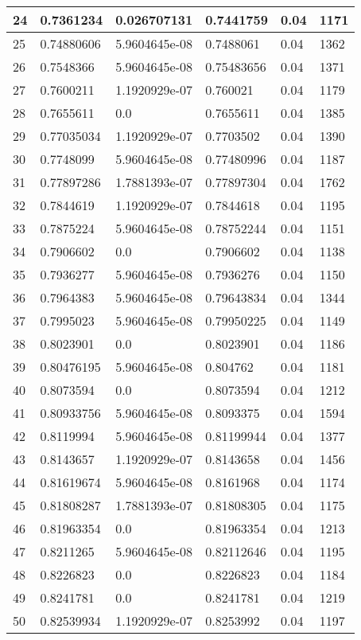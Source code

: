 \begin{longtable}{|l|l|l|l|l|l|}
24 & 0.7361234 & 0.026707131 & 0.7441759 & 0.04 & 1171 \\ \hline 
25 & 0.74880606 & 5.9604645e-08 & 0.7488061 & 0.04 & 1362 \\ \hline 
26 & 0.7548366 & 5.9604645e-08 & 0.75483656 & 0.04 & 1371 \\ \hline 
27 & 0.7600211 & 1.1920929e-07 & 0.760021 & 0.04 & 1179 \\ \hline 
28 & 0.7655611 & 0.0 & 0.7655611 & 0.04 & 1385 \\ \hline 
29 & 0.77035034 & 1.1920929e-07 & 0.7703502 & 0.04 & 1390 \\ \hline 
30 & 0.7748099 & 5.9604645e-08 & 0.77480996 & 0.04 & 1187 \\ \hline 
31 & 0.77897286 & 1.7881393e-07 & 0.77897304 & 0.04 & 1762 \\ \hline 
32 & 0.7844619 & 1.1920929e-07 & 0.7844618 & 0.04 & 1195 \\ \hline 
33 & 0.7875224 & 5.9604645e-08 & 0.78752244 & 0.04 & 1151 \\ \hline 
34 & 0.7906602 & 0.0 & 0.7906602 & 0.04 & 1138 \\ \hline 
35 & 0.7936277 & 5.9604645e-08 & 0.7936276 & 0.04 & 1150 \\ \hline 
36 & 0.7964383 & 5.9604645e-08 & 0.79643834 & 0.04 & 1344 \\ \hline 
37 & 0.7995023 & 5.9604645e-08 & 0.79950225 & 0.04 & 1149 \\ \hline 
38 & 0.8023901 & 0.0 & 0.8023901 & 0.04 & 1186 \\ \hline 
39 & 0.80476195 & 5.9604645e-08 & 0.804762 & 0.04 & 1181 \\ \hline 
40 & 0.8073594 & 0.0 & 0.8073594 & 0.04 & 1212 \\ \hline 
41 & 0.80933756 & 5.9604645e-08 & 0.8093375 & 0.04 & 1594 \\ \hline 
42 & 0.8119994 & 5.9604645e-08 & 0.81199944 & 0.04 & 1377 \\ \hline 
43 & 0.8143657 & 1.1920929e-07 & 0.8143658 & 0.04 & 1456 \\ \hline 
44 & 0.81619674 & 5.9604645e-08 & 0.8161968 & 0.04 & 1174 \\ \hline 
45 & 0.81808287 & 1.7881393e-07 & 0.81808305 & 0.04 & 1175 \\ \hline 
46 & 0.81963354 & 0.0 & 0.81963354 & 0.04 & 1213 \\ \hline 
47 & 0.8211265 & 5.9604645e-08 & 0.82112646 & 0.04 & 1195 \\ \hline 
48 & 0.8226823 & 0.0 & 0.8226823 & 0.04 & 1184 \\ \hline 
49 & 0.8241781 & 0.0 & 0.8241781 & 0.04 & 1219 \\ \hline 
50 & 0.82539934 & 1.1920929e-07 & 0.8253992 & 0.04 & 1197 \\ \hline 
\end{longtable}